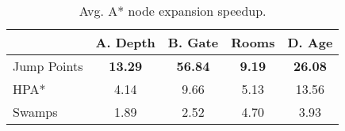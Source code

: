 \begin{table}[tb]
\begin{center}
\begin{tabular}{lcccc}
  \hline
 & A. Depth & B. Gate & Rooms & D. Age \\ 
  \hline
Jump Points & \textbf{13.29} & \textbf{56.84} & \textbf{9.19} & \textbf{26.08} \\ 
  HPA* & 4.14 & 9.66 & 5.13 & 13.56 \\ 
  Swamps & 1.89 & 2.52 & 4.70 & 3.93 \\ 
   \hline
\end{tabular}
\end{center}
\caption{Avg. A* node expansion speedup.} 
\label{table:nodes}
\end{table}

